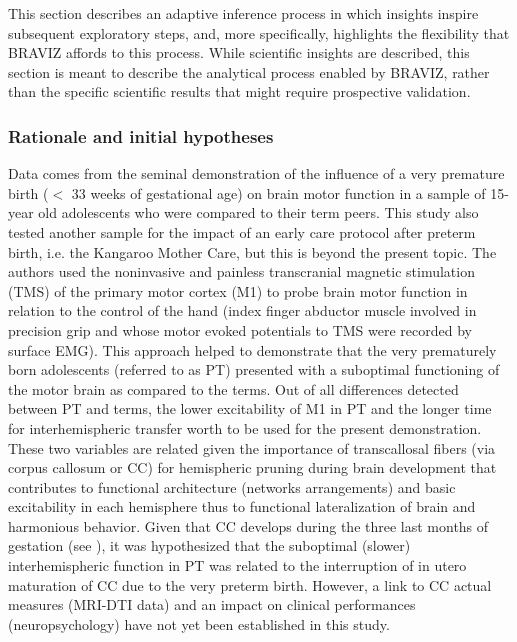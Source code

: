 \documentclass{frontiersHLTH}
\begin{document}
This section describes an adaptive inference process in which insights inspire subsequent exploratory steps, and, more specifically, highlights the flexibility that BRAVIZ affords to this process. While scientific insights are described, this section is meant to describe the analytical process enabled by BRAVIZ, rather than the specific scientific results that might require prospective validation.

\subsubsection{Rationale and initial hypotheses}

Data comes from the seminal demonstration \cite{schneider_cerebral_2012} of the influence of a very premature birth ($<$ 33 weeks of gestational age) on brain motor function in a sample of 15-year old adolescents who were compared to their term peers. This study also tested another sample for the impact of an early care protocol after preterm birth, i.e. the Kangaroo Mother Care, but this is beyond the present topic. The authors used the noninvasive and painless transcranial magnetic stimulation (TMS) of the primary motor cortex (M1) to probe brain motor function in relation to the control of the hand (index finger abductor muscle involved in precision grip and whose motor evoked potentials to TMS were recorded by surface EMG). This approach helped to demonstrate that the very prematurely born adolescents (referred to as PT) presented with a suboptimal functioning of the motor brain as compared to the terms. Out of all differences detected between PT and terms, the lower excitability of M1 in PT and the longer time for interhemispheric transfer worth to be used for the present demonstration. These two variables are related given the importance of transcallosal fibers (via corpus callosum or CC) for hemispheric pruning during brain development that contributes to functional architecture (networks arrangements) and basic excitability in each hemisphere thus to functional lateralization of brain and harmonious behavior. Given that CC develops during the three last months of gestation (see \cite{schneider_cerebral_2012}), it was hypothesized that the suboptimal (slower) interhemispheric function in PT was related to the interruption of in utero maturation of CC due to the very preterm birth. However, a link to CC actual measures (MRI-DTI data) and an impact on clinical performances (neuropsychology) have not yet been established in this study.
\end{document}
